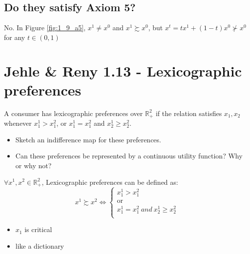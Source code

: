 \documentclass{article}
\newcommand{\R}{\mathbb{R}}
\begin{document}
\subsection{Do they satisfy Axiom 5?}

No. In Figure \ref{fig:1_9_a5}, $x^1 \ne x^0$ and $x^1 \succsim x^0$, but
$x^t=tx^1+(1-t)x^0 \nsucc x^0$ for any $t \in (0,1)$


{\centering
{}
\label{fig:1_9_a5}}


\section{Jehle \& Reny 1.13 - Lexicographic preferences}
A consumer has lexicographic preferences over $\R^2_+$ if the relation  satisfies $x_1, x_2$ whenever
$x_1^1 > x_1^2$, or $x_1^1 = x_1^2$ and $x_2^1 \ge x_2^2$.

\begin{itemize}
\item Sketch an indifference map for these preferences.
\item Can these preferences be represented by a continuous utility function? Why or why not?
\end{itemize}

\begin{mdframed}[backgroundcolor=blue!20,linecolor=white]
$\forall x^1,x^2 \in \R^2_+$, Lexicographic preferences can be defined as:
\begin{equation}
x^1 \succsim x^2 \Leftrightarrow
    \begin{cases}
      \text{$x^1_1 > x^2_1$}\\
      \text{or}\\
      \text{$x^1_1 = x^2_1 \ and \ x^1_2 \ge x^2_2$}\\
    \end{cases}
    \label{eq:laxi}  
\end{equation}
\begin{itemize}
\item $x_1$ is critical
\item like a dictionary
\end{itemize}
\end{mdframed}
\end{document}
